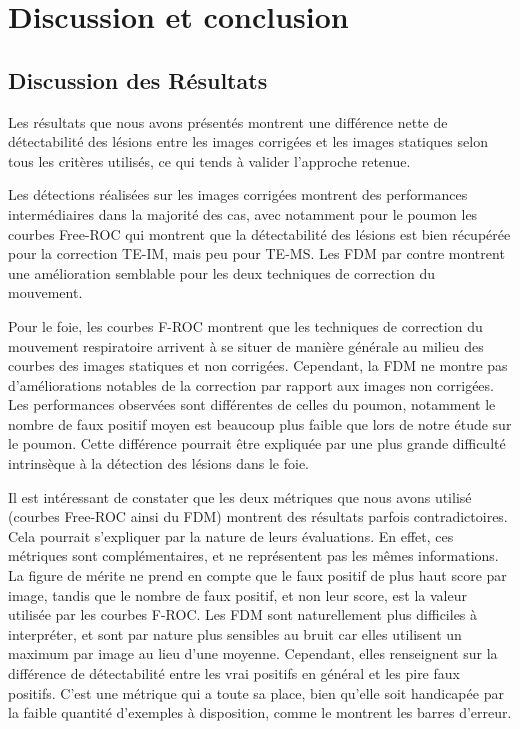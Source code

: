 \chapter{Discussion et conclusion}

\section{Discussion des Résultats}

Les résultats que nous avons présentés montrent une différence nette de détectabilité des lésions entre les images corrigées et les images statiques selon tous les critères utilisés, ce qui tends à valider l'approche retenue.

Les détections réalisées sur les images corrigées montrent des performances intermédiaires dans la majorité des cas, avec notamment pour le poumon les courbes Free-ROC qui montrent que la détectabilité des lésions est bien récupérée pour la correction TE-IM, mais peu pour TE-MS. Les FDM par contre montrent une amélioration semblable pour les deux techniques de correction du mouvement. 

Pour le foie, les courbes F-ROC montrent que les techniques de correction du mouvement respiratoire arrivent à se situer de manière générale au milieu des courbes des images statiques et non corrigées. Cependant, la FDM ne montre pas d'améliorations notables de la correction par rapport aux images non corrigées. Les performances observées sont différentes de celles du poumon, notamment le nombre de faux positif moyen est beaucoup plus faible que lors de notre étude sur le poumon. Cette différence pourrait être expliquée par une plus grande difficulté intrinsèque à la détection des lésions dans le foie.

Il est intéressant de constater que les deux métriques que nous avons utilisé (courbes Free-ROC ainsi du FDM) montrent des résultats parfois contradictoires. Cela pourrait s'expliquer par la nature de leurs évaluations. En effet, ces métriques sont complémentaires, et ne représentent pas les mêmes informations. La figure de mérite ne prend en compte que le faux positif de plus haut score par image, tandis que le nombre de faux positif, et non leur score, est la valeur utilisée par les courbes F-ROC. Les FDM sont naturellement plus difficiles à interpréter, et sont par nature plus sensibles au bruit car  elles utilisent un maximum par image au lieu d’une moyenne. Cependant, elles renseignent sur la différence de détectabilité entre les vrai  positifs en général et les pire faux positifs. C’est une métrique qui a toute sa place, bien qu’elle soit handicapée par la faible  quantité d’exemples à disposition, comme le montrent les barres d’erreur.

